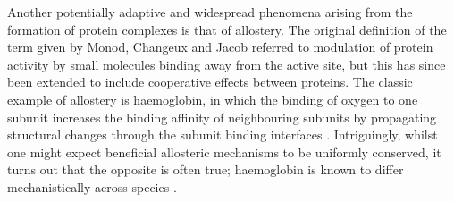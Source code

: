 \documentclass[a4paper,11pt,twoside,openright]{scrbook}
\begin{document}
Another potentially adaptive and widespread phenomena arising from the formation of protein complexes is that of allostery. The original definition of the term given by Monod, Changeux and Jacob \cite{Monod1963} referred to modulation of protein activity by small molecules binding away from the active site, but this has since been extended to include cooperative effects between proteins. The classic example of allostery is haemoglobin, in which the binding of oxygen to one subunit increases the binding affinity of neighbouring subunits by propagating structural changes through the subunit binding interfaces \cite{Perutz1976}. Intriguingly, whilst one might expect beneficial allosteric mechanisms to be uniformly conserved, it turns out that the opposite is often true; haemoglobin is known to differ mechanistically across species \cite{Kolatkar1988,Royer2005,Bellelli2011}.




\end{document}
